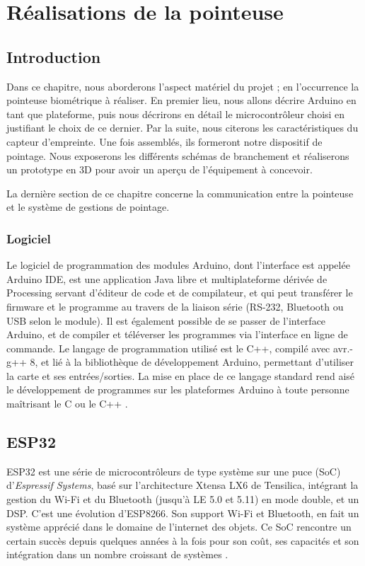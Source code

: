 \chapter{Réalisations de la pointeuse}
\renewcommand{\headrulewidth}{1pt}

\section{Introduction}
Dans ce chapitre, nous aborderons l’aspect matériel du projet ; en l’occurrence 
la pointeuse biométrique à réaliser. En premier lieu, nous allons décrire 
Arduino en tant que plateforme, puis nous décrirons en détail le microcontrôleur 
choisi en justifiant le choix de ce dernier. Par la suite, nous citerons les 
caractéristiques du capteur d’empreinte. Une fois assemblés, ils formeront notre 
dispositif de pointage. Nous exposerons les différents schémas de branchement et 
réaliserons un prototype en 3D pour avoir un aperçu de l’équipement à concevoir. 

La dernière section de ce chapitre concerne la communication entre la pointeuse 
et le système de gestions de pointage.


\subsection{Logiciel}
Le logiciel de programmation des modules Arduino, dont l’interface est appelée 
Arduino IDE, est une application Java libre et multiplateforme dérivée de 
Processing servant d’éditeur de code et de compilateur, et qui peut transférer 
le firmware et le programme au travers de la liaison série (RS-232, Bluetooth 
ou USB selon le module). Il est également possible de se passer de l’interface 
Arduino, et de compiler et téléverser les programmes via l’interface en ligne 
de commande. Le langage de programmation utilisé est le C++, compilé avec 
avr.-g++ 8, et lié à la bibliothèque de développement Arduino, permettant 
d’utiliser la carte et ses entrées/sorties. La mise en place de ce langage 
standard rend aisé le développement de programmes sur les plateformes Arduino à 
toute personne maîtrisant le C ou le C++ \cite{31}.

\section{ESP32}
ESP32 est une série de microcontrôleurs de type système sur une puce (SoC)
d’\emph{Espressif Systems}, basé sur l’architecture Xtensa LX6 de Tensilica, intégrant la gestion du Wi-Fi et du Bluetooth (jusqu’à LE 5.0 et 5.11) en
mode double, et un DSP. C’est une évolution d’ESP8266. Son support Wi-Fi et
Bluetooth, en fait un système apprécié dans le domaine de l’internet des objets.
Ce SoC rencontre un certain succès depuis quelques années à la fois pour son
coût, ses capacités et son intégration dans un nombre croissant de
systèmes \cite{32}.

